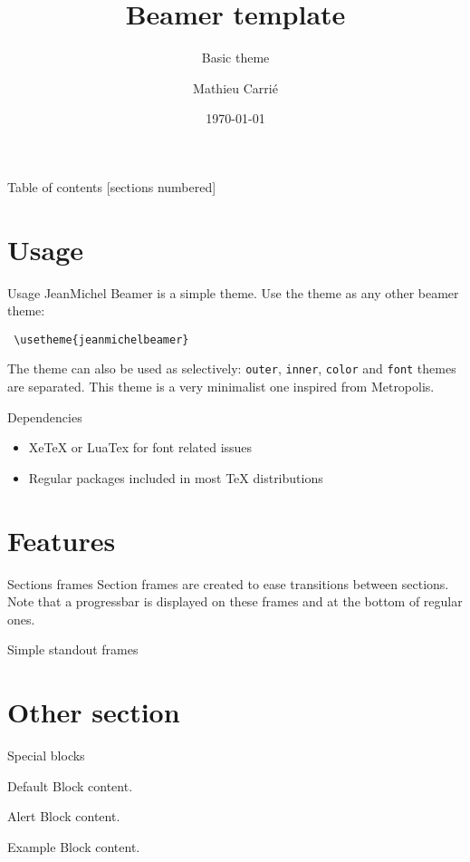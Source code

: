\documentclass[10pt]{beamer}
\title{Beamer template}
\subtitle{Basic theme}
\date{\today}
\author{Mathieu Carrié}
\institute{Prout}
\begin{document}
\maketitle

\begin{frame}[plain]{Table of contents}
  [sections numbered]
  \tableofcontents[hideallsubsections]
\end{frame}

\section{Usage}

\begin{frame}[fragile]{Usage}
    JeanMichel Beamer is a simple theme.
    Use the theme as any other beamer theme:

    \begin{verbatim} \usetheme{jeanmichelbeamer} \end{verbatim}

    The theme can also be used as selectively: \texttt{outer}, \texttt{inner}, \texttt{color} and \texttt{font} themes are separated.
    This theme is a very minimalist one inspired from Metropolis.
\end{frame}

\begin{frame}{Dependencies}
    \begin{itemize}
        \item XeTeX or LuaTex for font related issues
        \item Regular packages included in most TeX distributions
    \end{itemize}
\end{frame}

\section{Features}

\begin{frame}{Sections frames}
    Section frames are created to ease transitions between sections. Note that a progressbar is displayed on these frames and at the bottom of regular ones.
\end{frame}

\begin{standout}
    Simple standout frames
\end{standout}

\section{Other section}

\begin{frame}{Special blocks}
  \begin{block}{Default}
    Block content.
  \end{block}

  \begin{alertblock}{Alert}
    Block content.
  \end{alertblock}

  \begin{exampleblock}{Example}
    Block content.
  \end{exampleblock}
\end{frame}
\end{document}
